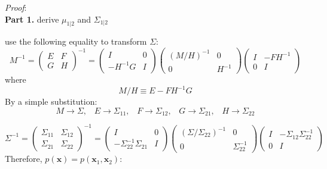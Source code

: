 \documentclass{article}
\begin{document}

\noindent
\textit{Proof}: \\
\newline
\noindent
\textbf{Part 1.} derive $\mu_{1 | 2}$ and $\Sigma_{1 | 2}$

\noindent
use the following equality to transform $\Sigma$:
\begin{equation*}
M^{-1} = \begin{pmatrix} E & F \\ G & H \end{pmatrix}^{-1} = \begin{pmatrix} I & 0 \\ -H^{-1} G & I \end{pmatrix}   \begin{pmatrix} (M/H)^{-1} & 0 \\ 0 & H^{-1}  \end{pmatrix}   \begin{pmatrix} I & -F H^{-1} \\ 0 & I \end{pmatrix}
\end{equation*}
where
\begin{equation*}
M/H \equiv E - F H^{-1} G
\end{equation*}
By a simple substitution:
\begin{equation*}
M \rightarrow \Sigma, \hspace{10pt} E \rightarrow \Sigma_{11}, \hspace{10pt} F \rightarrow \Sigma_{12},  \hspace{10pt} G \rightarrow \Sigma_{21},  \hspace{10pt} H \rightarrow \Sigma_{22}
\end{equation*}

\begin{equation*}
\Sigma^{-1} = \begin{pmatrix} \Sigma_{11} & \Sigma_{12} \\ \Sigma_{21} & \Sigma_{22} \end{pmatrix}^{-1} = \begin{pmatrix} I & 0 \\ - \Sigma_{22}^{-1} \Sigma_{21} & I \end{pmatrix} \begin{pmatrix} (\Sigma/\Sigma_{22})^{-1} & 0 \\ 0 & \Sigma_{22}^{-1} \end{pmatrix} \begin{pmatrix} I & -\Sigma_{12} \Sigma_{22}^{-1} \\ 0 & I \end{pmatrix}
\end{equation*}
\newline
\noindent
Therefore, $p(\textbf{x}) = p(\textbf{x}_1, \textbf{x}_2)$:
\end{document}
